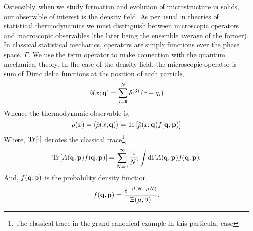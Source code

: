Ostensibly, when we study formation and evolution of microstructure in solids,
our observable of interest is the density field.  As per usual in theories of
statistical thermodynamics we must distinguish between microscopic operators
and macroscopic observables (the later being the ensemble average of the
former).  In classical statistical mechanics, operators are simply functions
over the phase space, $\Gamma$.  We use the term operator to make connection
with the quantum mechanical theory.  In the case of the density field, the
microscopic operator is sum of Dirac delta functions at the position of each
particle,
%
\begin{equation} 
    \hat{\rho}(x; \mathbf{q}) = \sum_{i = 0}^N \delta^{(3)}\left(x - q_i\right)
\end{equation}
%
Whence the thermodynamic observable is, 
%
\begin{equation} 
    \label{mean_density} 
    \rho(x) = \left\langle \hat{\rho}(x; \mathbf{q}) \right\rangle = 
        \mathrm{Tr}\left[ \hat{\rho}(x; \mathbf{q}) f(\mathbf{q}, \mathbf{p}) \right]
\end{equation}
%
Where, $\mathrm{Tr}\left[ \cdot \right]$ denotes the classical trace\footnote{The classical trace
in the grand canonical example in this particular case},
%
\begin{equation}
    \mathrm{Tr}\left[ A(\mathbf{q}, \mathbf{p}) f(\mathbf{q}, \mathbf{p}) \right] = \sum_{N =0}^\infty
        \frac{1}{N!}\int\mathrm{d}\Gamma A(\mathbf{q}, \mathbf{p}) f(\mathbf{q}, \mathbf{p}), 
\end{equation}
%
And, $f(\mathbf{q}, \mathbf{p})$ is the probability density function,
%
\begin{equation} 
    f(\mathbf{q}, \mathbf{p}) = \frac{e^{-\beta (\mathcal{H} - \mu N)}}{\Xi(\mu, \beta)}.
\end{equation}
%

